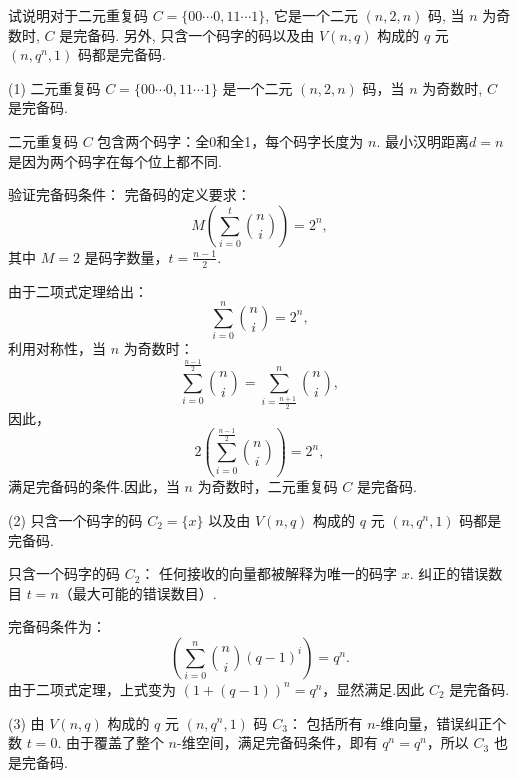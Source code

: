 \newpage
 \begin{tcolorbox}[breakable,colback=blue!5!white,colframe=blue!75!black,
 title= 解答题]

试说明对于二元重复码 $ C=\{00 \cdots 0,11 \cdots 1\} $, 它是一个二元 $ (n, 2, n) $ 码, 当 $ n $ 为奇数时, $ C $ 是完备码. 另外, 只含一个码字的码以及由 $ V(n, q) $ 构成的 $ q $ 元 $ \left(n, q^{n}, 1\right) $ 码都是完备码.

 \tcblower
(1) 二元重复码 \( C=\{00 \cdots 0, 11 \cdots 1\} \) 是一个二元 \( (n, 2, n) \) 码，当 \( n \) 为奇数时, \( C \) 是完备码.

二元重复码 \( C \) 包含两个码字：全0和全1，每个码字长度为 \( n \).
最小汉明距离\( d = n \) 是因为两个码字在每个位上都不同.

验证完备码条件：
完备码的定义要求：
$$
M \left( \sum_{i=0}^t \binom{n}{i} \right) = 2^n,
$$
其中 \( M = 2 \) 是码字数量，\( t = \frac{n-1}{2} \).

由于二项式定理给出：
$$
\sum_{i=0}^n \binom{n}{i} = 2^n,
$$
利用对称性，当 \( n \) 为奇数时：
$$
\sum_{i=0}^{\frac{n-1}{2}} \binom{n}{i} = \sum_{i=\frac{n+1}{2}}^n \binom{n}{i},
$$
因此，
$$
2 \left( \sum_{i=0}^{\frac{n-1}{2}} \binom{n}{i} \right) = 2^n,
$$
满足完备码的条件.因此，当 \( n \) 为奇数时，二元重复码 \( C \) 是完备码.


(2) 只含一个码字的码 \( C_2=\{x\} \) 以及由 \( V(n, q) \) 构成的 \( q \) 元 \( (n, q^n, 1) \) 码都是完备码.

只含一个码字的码 \( C_2 \)： 任何接收的向量都被解释为唯一的码字 \( x \). 纠正的错误数目 \( t = n \)（最大可能的错误数目）.

完备码条件为：
$$
\left( \sum_{i=0}^n \binom{n}{i} (q-1)^i \right) = q^n.
$$
由于二项式定理，上式变为 \( (1 + (q-1))^n = q^n \)，显然满足.因此 \( C_2 \) 是完备码.

(3) 由 \( V(n, q) \) 构成的 \( q \) 元 \( (n, q^n, 1) \) 码 \( C_3 \)： 包括所有 \( n \)-维向量，错误纠正个数 \( t = 0 \).
 由于覆盖了整个 \( n \)-维空间，满足完备码条件，即有 \( q^n = q^n \)，所以 \( C_3 \) 也是完备码.
\end{tcolorbox}